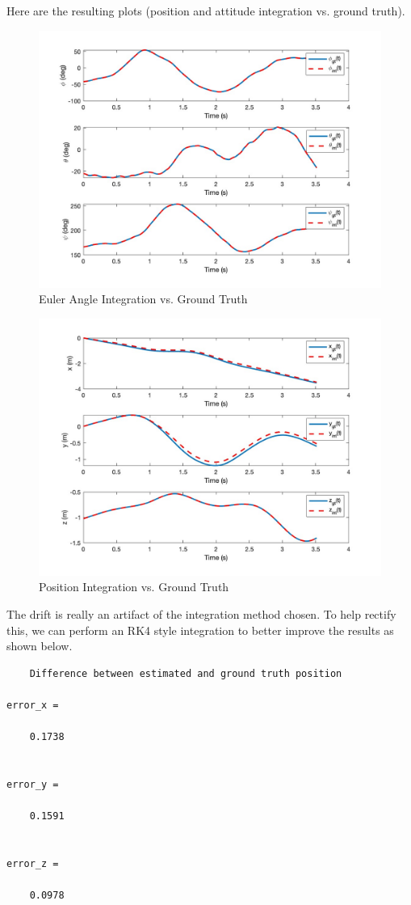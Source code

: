 \documentclass{article}
\begin{document}
Here are the resulting plots (position and attitude integration vs. ground truth).
\begin{figure}[H]
    \centering
    \includegraphics[width=0.8\linewidth]{parta_euler_angles.jpg}
    \caption{Euler Angle Integration vs. Ground Truth}
\end{figure}

\begin{figure}[H]
    \centering
    \includegraphics[width=0.8\linewidth]{parta_position.jpg}
    \caption{Position Integration vs. Ground Truth}
\end{figure}

The drift is really an artifact of the integration method chosen. To help rectify this, we can perform an RK4 style integration to better improve the results as shown below.


\begin{verbatim}
    Difference between estimated and ground truth position

error_x =

    0.1738


error_y =

    0.1591


error_z =

    0.0978
\end{verbatim}
\end{document}
